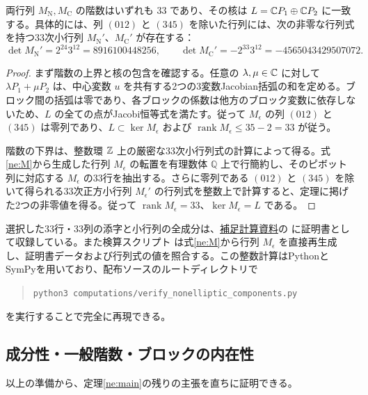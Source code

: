 \begin{lemma}[Jacobi方程式の線形化の階数]\label{ne:rank}
両行列 $M_{\mathrm N},M_{\mathrm C}$ の階数はいずれも $33$ であり、その核は $L=\mathbb C P_1\oplus\mathbb C P_2$ に一致する。具体的には、列 $(012)$ と $(345)$ を除いた行列には、次の非零な行列式を持つ33次小行列 $M_{\mathrm N}'$、$M_{\mathrm C}'$ が存在する：
\begin{equation}
\det M_{\mathrm N}'=2^{24}3^{12}=8916100448256,\qquad
\det M_{\mathrm C}'=-2^{33}3^{12}=-4565043429507072.
\end{equation}
\end{lemma}
\begin{proof}
まず階数の上界と核の包含を確認する。任意の $\lambda,\mu\in\mathbb C$ に対して $\lambda P_1+\mu P_2$ は、中心変数 $u$ を共有する2つの3変数Jacobian括弧の和を定める。ブロック間の括弧は零であり、各ブロックの係数は他方のブロック変数に依存しないため、$L$ の全ての点がJacobi恒等式を満たす。従って $M_\epsilon$ の列 $(012)$ と $(345)$ は零列であり、$L\subset\ker M_\epsilon$ および $\operatorname{rank} M_\epsilon\le 35-2=33$ が従う。

階数の下界は、整数環 $\mathbb Z$ 上の厳密な33次小行列式の計算によって得る。式\eqref{ne:M}から生成した行列 $M_\epsilon$ の転置を有理数体 $\mathbb Q$ 上で行簡約し、そのピボット列に対応する $M_\epsilon$ の33行を抽出する。さらに零列である $(012)$ と $(345)$ を除いて得られる33次正方小行列 $M_\epsilon'$ の行列式を整数上で計算すると、定理に掲げた2つの非零値を得る。従って $\operatorname{rank} M_\epsilon=33$、$\ker M_\epsilon=L$ である。
\end{proof}

選択した33行・33列の添字と小行列の全成分は、\href{https://github.com/uedakazushi/poisson-cubic/tree/1f8d4c305a9c5c4eff4c21657254255a1a6ebf51/computations}{補足計算資料}の  に証明書として収録している。また検算スクリプト  は式\eqref{ne:M}から行列 $M_\epsilon$ を直接再生成し、証明書データおよび行列式の値を照合する。この整数計算はPythonとSymPyを用いており、配布ソースのルートディレクトリで
\begin{quote}
\small\verb|python3 computations/verify_nonelliptic_components.py|
\end{quote}
を実行することで完全に再現できる。

\subsection{成分性・一般階数・ブロックの内在性}
以上の準備から、定理\ref{ne:main}の残りの主張を直ちに証明できる。

